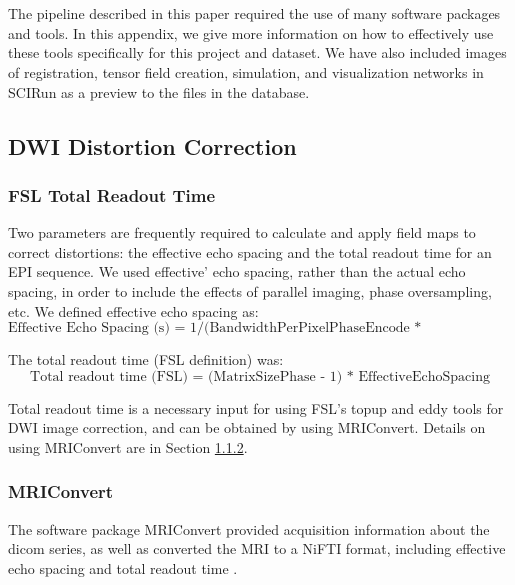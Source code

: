
\section{ }
\label{sec:Appendix}

The pipeline described in this paper required the use of many software packages and tools. In this appendix, we give more information on how to effectively use these tools specifically for this project and dataset. We have also included images of registration, tensor field creation, simulation, and visualization networks in SCIRun as a preview to the files in the database.

\subsection{DWI Distortion Correction}
\label{sec:distortion}

\subsubsection{FSL Total Readout Time}

Two parameters are frequently required to calculate and apply field maps to correct distortions: the effective echo spacing and the total readout time for an EPI sequence.  We used effective' echo spacing, rather than the actual echo spacing, in order to include the effects of parallel imaging, phase oversampling, etc. We defined effective echo spacing as:
\[
\text{Effective Echo Spacing (s) = 1/(BandwidthPerPixelPhaseEncode * MatrixSizePhase)}
\]

The total readout time (FSL definition) was:
\[
\text{Total readout time (FSL) = (MatrixSizePhase - 1) * EffectiveEchoSpacing}
\]

Total readout time is a necessary input for using FSL's topup and eddy tools for DWI image correction, and can be obtained by using MRIConvert. Details on using MRIConvert are in Section \ref{sec:MRIConvert}.

\subsubsection{MRIConvert}
\label{sec:MRIConvert}

The software package MRIConvert provided acquisition information about the dicom series, as well as converted the MRI to a NiFTI format, including effective echo spacing and total readout time \cite{ref:mriconvert}. 

